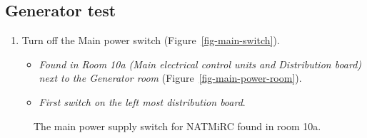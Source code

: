 \documentclass[
  letterpaper,
  DIV=11,
  numbers=noendperiod]{scrreprt}
\providecommand{\tightlist}{%
  \setlength{\itemsep}{0pt}\setlength{\parskip}{0pt}}\usepackage{longtable,booktabs,array}
\begin{document}
\hypertarget{sec-gen-test}{%
\subsection{Generator test}\label{sec-gen-test}}

\begin{enumerate}
\def\labelenumi{\arabic{enumi}.}
\setcounter{enumi}{5}
\tightlist
\item
  Turn off the Main power switch (Figure~\ref{fig-main-switch}).

  \begin{itemize}
  \tightlist
  \item
    \emph{Found in Room 10a (Main electrical control units and
    Distribution board) next to the Generator room}
    (Figure~\ref{fig-main-power-room}).
  \item
    \emph{First switch on the left most distribution board}.
  \end{itemize}
\end{enumerate}

\begin{figure}[H]

\begin{minipage}[t]{0.50\linewidth}

{\centering 


}

\end{minipage}%
%
\begin{minipage}[t]{0.50\linewidth}

{\centering 


}

\end{minipage}%

\caption{\label{fig-mains-comp}The main power supply switch for NATMiRC
found in room 10a.}

\end{figure}
\end{document}
